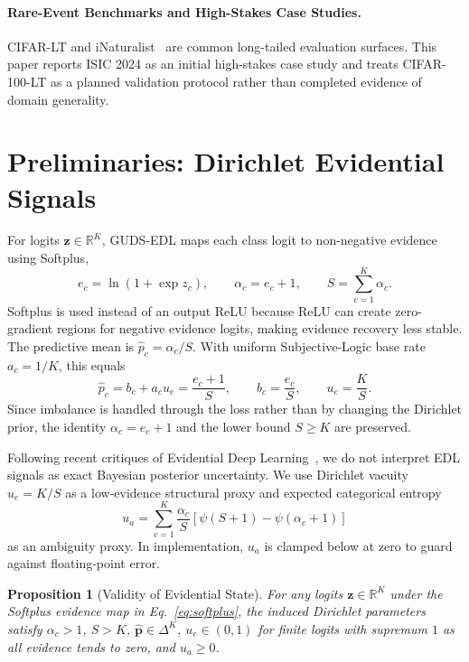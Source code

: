 \documentclass[letterpaper]{article} %
\newcommand{\R}{\mathbb{R}}
\newtheorem{proposition}{Proposition}
\begin{document}
\paragraph{Rare-Event Benchmarks and High-Stakes Case Studies.} CIFAR-LT and iNaturalist~\cite{liu2019large} are common long-tailed evaluation surfaces. This paper reports ISIC 2024 as an initial high-stakes case study and treats CIFAR-100-LT as a planned validation protocol rather than completed evidence of domain generality.

\section{Preliminaries: Dirichlet Evidential Signals}\label{sec:math}

For logits $\bm{z}\in\R^K$, GUDS-EDL maps each class logit to non-negative evidence using Softplus,
\begin{equation}\label{eq:softplus}
    e_c=\ln(1+\exp z_c),\qquad
    \alpha_c=e_c+1,\qquad
    S=\sum_{c=1}^K\alpha_c .
\end{equation}
Softplus is used instead of an output ReLU because ReLU can create zero-gradient regions for negative evidence logits, making evidence recovery less stable. The predictive mean is $\hat p_c=\alpha_c/S$. With uniform Subjective-Logic base rate $a_c=1/K$, this equals
\begin{equation}\label{eq:p_hat}
    \hat p_c=b_c+a_cu_e=\frac{e_c+1}{S},
    \qquad b_c=\frac{e_c}{S},\qquad u_e=\frac{K}{S}.
\end{equation}
Since imbalance is handled through the loss rather than by changing the Dirichlet prior, the identity $\alpha_c=e_c+1$ and the lower bound $S\ge K$ are preserved.

Following recent critiques of Evidential Deep Learning~\cite{shen2024mirage}, we do not interpret EDL signals as exact Bayesian posterior uncertainty. We use Dirichlet vacuity $u_e=K/S$ as a low-evidence structural proxy and expected categorical entropy
\begin{equation}\label{eq:u_a}
    u_a = \sum_{c=1}^K \frac{\alpha_c}{S} \left[\psi(S + 1) - \psi(\alpha_c + 1)\right]
\end{equation}
as an ambiguity proxy. In implementation, $u_a$ is clamped below at zero to guard against floating-point error.

\begin{proposition}[Validity of Evidential State]
\label{prop:evidential_validity}
For any logits $\bm{z}\in\R^K$ under the Softplus evidence map in Eq.~\ref{eq:softplus}, the induced Dirichlet parameters satisfy $\alpha_c>1$, $S>K$, $\hat{\bm{p}}\in\Delta^K$, $u_e\in(0,1)$ for finite logits with supremum $1$ as all evidence tends to zero, and $u_a\ge0$.
\end{proposition}
\end{document}
